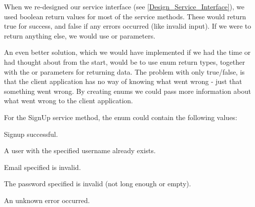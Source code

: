 When we re-designed our service interface (see \ref{Design_Service_Interface}), we used boolean return values for most of the service methods. These would return true for success, and false if any errors occurred (like invalid input). If we were to return anything else, we would use  or  parameters.

An even better solution, which we would have implemented if we had the time or had thought about from the start, would be to use enum return types, together with the  or  parameters for returning data. The problem with only true/false, is that the client application has no way of knowing what went wrong - just that something went wrong. By creating enums we could pass more information about what went wrong to the client application.

For the SignUp service method, the enum could contain the following values:

\begin{my_description}
\item[Success] Signup successful.
\item[UsernameInUse] A user with the specified username already exists.
\item[InvalidEmail] Email specified is invalid.
\item[InvalidPassword] The password specified is invalid (not long enough or empty).
\item[Error] An unknown error occurred.
\end{my_description}